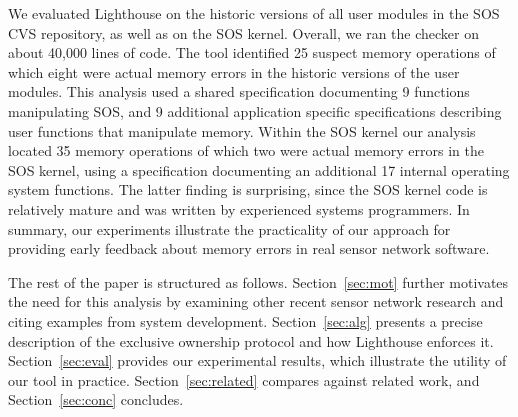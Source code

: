 We evaluated Lighthouse on the historic versions of all user modules in the
SOS CVS repository, as well as on the SOS kernel.  
%
Overall, we ran the checker on about 40,000 lines of code.  
%
The tool identified 25 suspect memory operations of which eight were actual
memory errors in the historic versions of the user modules.
%
This analysis used a shared specification documenting 9 functions
manipulating SOS, and 9 additional application specific specifications
describing user functions that manipulate memory.
%
Within the SOS kernel our analysis located 35 memory operations of which two
were actual memory errors in the SOS kernel, using a specification
documenting an additional 17 internal operating system functions.  
%
The latter finding is surprising, since the SOS kernel code is
relatively mature and was written by experienced systems programmers.  
%
In summary, our experiments illustrate the practicality of our approach for
providing early feedback about memory errors in real sensor network
software.



The rest of the paper is structured as follows.  
%
Section~\ref{sec:mot} further motivates the need for this analysis by
examining other recent sensor network research and citing examples from
system development.
%
Section~\ref{sec:alg} presents a precise description of the exclusive
ownership protocol and how Lighthouse enforces it.  
%
Section~\ref{sec:eval} provides our experimental results, which illustrate
the utility of our tool in practice.  
%
Section~\ref{sec:related} compares against related work, and
Section~\ref{sec:conc} concludes.



